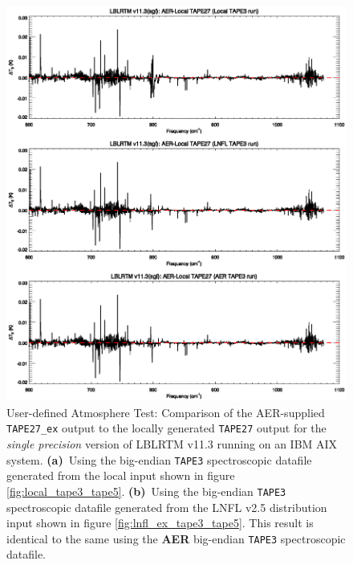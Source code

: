 \begin{figure}[htp]
  \includegraphics[bb=82 313 534 472,clip,scale=1.0]{graphics/run_example_user_defined_upwelling/ibm/sgl.eps}
  \caption{User-defined Atmosphere Test: Comparison of the AER-supplied \texttt{TAPE27\_ex} output to the locally generated \texttt{TAPE27} output for the \textsl{single precision} version of LBLRTM v11.3 running on an IBM AIX system. \mbox{\textbf{(a)} Using} the big-endian \texttt{TAPE3} spectroscopic datafile generated from the local input shown in figure \ref{fig:local_tape3_tape5}. \mbox{\textbf{(b)} Using} the big-endian \texttt{TAPE3} spectroscopic datafile generated from the LNFL v2.5 distribution input shown in figure \ref{fig:lnfl_ex_tape3_tape5}. This result is identical to the same using the \textbf{AER} big-endian \texttt{TAPE3} spectroscopic datafile.}
  \label{fig:run_example_user_defined_upwelling-sgl_ibm}
\end{figure}


